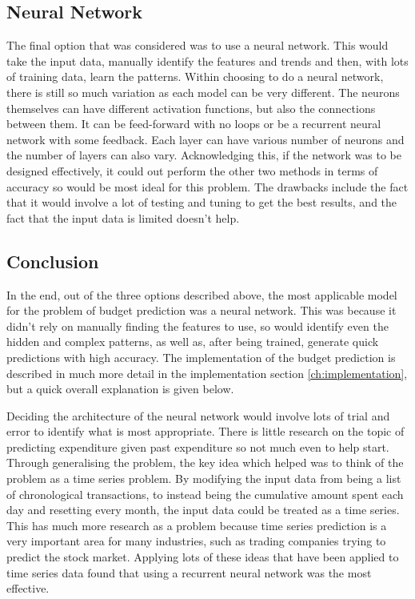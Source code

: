\subsection{Neural Network}
The final option that was considered was to use a neural network. This would take the input data, manually identify the features and trends and then, with lots of training data, learn the patterns. Within choosing to do a neural network, there is still so much variation as each model can be very different. The neurons themselves can have different activation functions, but also the connections between them. It can be feed-forward with no loops or be a recurrent neural network with some feedback. Each layer can have various number of neurons and the number of layers can also vary. Acknowledging this, if the network was to be designed effectively, it could out perform the other two methods in terms of accuracy so would be most ideal for this problem. The drawbacks include the fact that it would involve a lot of testing and tuning to get the best results, and the fact that the input data is limited doesn't help.

\subsection{Conclusion}
In the end, out of the three options described above, the most applicable model for the problem of budget prediction was a neural network. This was because it didn't rely on manually finding the features to use, so would identify even the hidden and complex patterns, as well as, after being trained, generate quick predictions with high accuracy. The implementation of the budget prediction is described in much more detail in the implementation section \ref{ch:implementation}, but a quick overall explanation is given below.

Deciding the architecture of the neural network would involve lots of trial and error to identify what is most appropriate. There is little research on the topic of predicting expenditure given past expenditure so not much even to help start. Through generalising the problem, the key idea which helped was to think of the problem as a time series problem. By modifying the input data from being a list of chronological transactions, to instead being the cumulative amount spent each day and resetting every month, the input data could be treated as a time series. This has much more research as a problem because time series prediction is a very important area for many industries, such as trading companies trying to predict the stock market. Applying lots of these ideas that have been applied to time series data found that using a recurrent neural network was the most effective.

